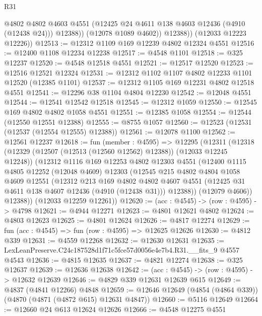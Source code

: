 \begin{lexlean}{R31}
\begin{coremodule}
                @4802
                @4802
                @4603
                @4551
                (@12425 @24 @4611 @138 @4603 @12436 (@4910 (@12438 @24)))
                @12388))
            (@12078 @1089 @4602))
          @12388))
      (@12033 @12223 @12226))
@12513 := @12312 @1109 @169 @12239 @4802 @12324 @4551
@12516 := @12400 @1108 @12234 @12238
@12517 := @4548 @1101
@12518 := @325 @12237
@12520 := @4548 @12518 @4551
@12521 := @12517 @12520
@12523 := @12516 @12521 @12324
@12531 := @12312 @1102 @1107 @4802 @12233 @1101 @12520 (@12385 @1101)
@12537 := @12312 @1105 @169 @12231 @4802 @12518 @4551
@12541 := @12296 @38 @1104 @4804 @12230
@12542 := @12048 @4551
@12544 := @12541 @12542 @12518
@12545 := @12312 @1059
@12550 := @12545 @169 @4802 @4802 @1058 @4551
@12551 := @12385 @1058
@12554 := @12544 (@12550 @12551 @12388)
@12555 := @8755 @1057
@12560 := @12523 (@12531 (@12537 (@12554 @12555) @12388))
@12561 := @12078 @1100
@12562 := @12561 @12237
@12618 := fun (member : @4595) =>
  @12295
    (@12311
      (@12318
        (@12329 (@12507 (@12513 (@12560 @12562) @12388)) (@12033 @12245 @12248))
        (@12312
          @1116
          @169
          @12253
          @4802
          @12303
          @4551
          (@12400
            @1115
            @4805
            @12252
            (@12048 @4609)
            @12303
            (@12545
              @215
              @4802
              @4804
              @1058
              @4609
              @12551
              (@12312
                @213
                @169
                @4802
                @4802
                @4607
                @4551
                (@12425 @31 @4611 @138 @4607 @12436 (@4910 (@12438 @31)))
                @12388))
            (@12079 @4606))
          @12388))
      (@12033 @12259 @12261))
@12620 := (acc : @4545) -> (row : @4595) -> @4798
@12621 := @4944 @12271
@12623 := @4801 @12621 @4802
@12624 := @4803 @12623
@12625 := @4801 @12624
@12626 := @4817 @12274
@12629 := fun (acc : @4545) => fun (row : @4595) => @12625 @12626
@12630 := @4812 @339
@12631 := @4559 @12268
@12632 := @12630 @12631
@12635 := LexLeanPreserve.C24c187528d1f71c5fce57d0056e4e7b4.R31.__fits_9 @4557 @4543
@12636 := @4815 @12635
@12637 := @4821 @12274
@12638 := @325 @12637
@12639 := @12636 @12638
@12642 := (acc : @4545) -> (row : @4595) -> @12632 @12639
@12646 := @4829 @339 @12631 @12639 @615
@12649 := @4837 (@4841 @12266) @4848
@12659 := @12646 @12649 (@4854 (@4864 @339)) (@4870 (@4871 (@4872 @615) @12631 @4847))
@12660 := @5116 @12649
@12664 := @12660 @24 @613 @12624 @12626
@12666 := @4548 @12275 @4551

\end{coremodule}
\end{lexlean}

